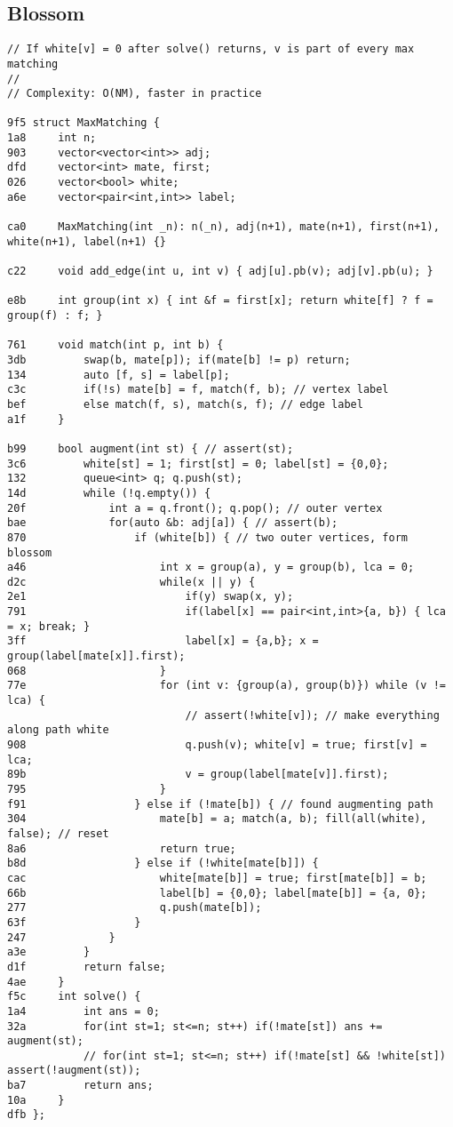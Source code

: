 \documentclass[11pt, a4paper, twoside]{article}
\begin{document}
\subsection{Blossom}
\begin{lstlisting}
// If white[v] = 0 after solve() returns, v is part of every max matching
//
// Complexity: O(NM), faster in practice

9f5 struct MaxMatching {
1a8 	int n;
903 	vector<vector<int>> adj;
dfd 	vector<int> mate, first;
026 	vector<bool> white;
a6e 	vector<pair<int,int>> label;
    
ca0 	MaxMatching(int _n): n(_n), adj(n+1), mate(n+1), first(n+1), white(n+1), label(n+1) {}
    
c22 	void add_edge(int u, int v) { adj[u].pb(v); adj[v].pb(u); }
    
e8b 	int group(int x) { int &f = first[x]; return white[f] ? f = group(f) : f; }
    
761 	void match(int p, int b) {
3db 		swap(b, mate[p]); if(mate[b] != p) return;
134 		auto [f, s] = label[p];
c3c 		if(!s) mate[b] = f, match(f, b); // vertex label
bef 		else match(f, s), match(s, f); // edge label
a1f 	}
    
b99 	bool augment(int st) { // assert(st);
3c6 		white[st] = 1; first[st] = 0; label[st] = {0,0};
132 		queue<int> q; q.push(st);
14d 		while (!q.empty()) {
20f 			int a = q.front(); q.pop(); // outer vertex
bae 			for(auto &b: adj[a]) { // assert(b);
870 				if (white[b]) { // two outer vertices, form blossom
a46 					int x = group(a), y = group(b), lca = 0;
d2c 					while(x || y) {
2e1 						if(y) swap(x, y);
791 						if(label[x] == pair<int,int>{a, b}) { lca = x; break; }
3ff 						label[x] = {a,b}; x = group(label[mate[x]].first);
068 					}
77e 					for (int v: {group(a), group(b)}) while (v != lca) {
    						// assert(!white[v]); // make everything along path white
908 						q.push(v); white[v] = true; first[v] = lca;
89b 						v = group(label[mate[v]].first);
795 					}
f91 				} else if (!mate[b]) { // found augmenting path
304 					mate[b] = a; match(a, b); fill(all(white), false); // reset
8a6 					return true;
b8d 				} else if (!white[mate[b]]) {
cac 					white[mate[b]] = true; first[mate[b]] = b;
66b 					label[b] = {0,0}; label[mate[b]] = {a, 0};
277 					q.push(mate[b]);
63f 				}
247 			}
a3e 		}
d1f 		return false;
4ae 	}
f5c 	int solve() {
1a4 		int ans = 0;
32a 		for(int st=1; st<=n; st++) if(!mate[st]) ans += augment(st);
    		// for(int st=1; st<=n; st++) if(!mate[st] && !white[st]) assert(!augment(st));
ba7 		return ans;
10a 	}
dfb };
\end{lstlisting}
\end{document}
